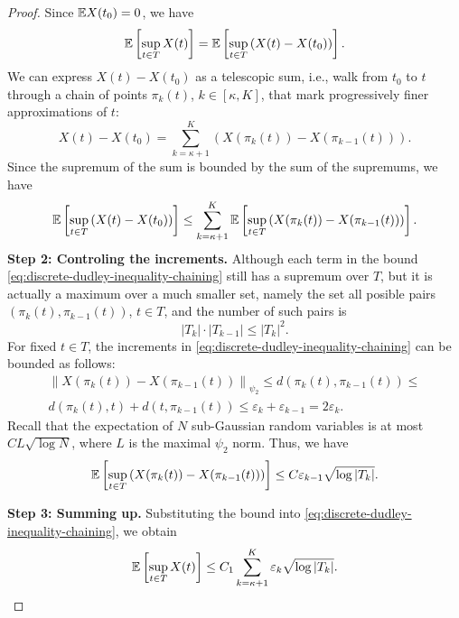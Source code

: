 \begin{proof}
    Since \({\mathbb E} X(t_{0})=0\), we have
    \begin{equation*}
        {\mathbb E}\left[\sup_{t\in T}X(t)\right]={\mathbb E}\left[\sup_{t\in T}\left(X(t)-X(t_{0})\right)\right].
    \end{equation*}
    We can express \(X(t)-X(t_{0})\) as a telescopic sum, i.e., walk from \(t_{0}\) to \(t\) through a chain of points \(\pi_{k}(t)\), \(k\in[\kappa,K]\), that mark progressively finer approximations of \(t\):
    \begin{equation*}
        X(t)-X(t_{0})=\sum_{k=\kappa+1}^{K}\left(X(\pi_{k}(t))-X(\pi_{k-1}(t))\right).
    \end{equation*}
    Since the supremum of the sum is bounded by the sum of the supremums, we have
    \begin{equation}
        \label{eq:discrete-dudley-inequality-chaining}
        {\mathbb E}\left[\sup_{t\in T}\left(X(t)-X(t_{0})\right)\right]\leq\sum_{k=\kappa+1}^{K}{\mathbb E}\left[\sup_{t\in T}\left(X(\pi_{k}(t))-X(\pi_{k-1}(t))\right)\right].
    \end{equation}
    \textbf{Step 2: Controling the increments.} Although each term in the bound \eqref{eq:discrete-dudley-inequality-chaining} still has a supremum over \(T\), but it is actually a maximum over a much smaller set, namely the set all posible pairs \((\pi_{k}(t),\pi_{k-1}(t))\), \(t\in T\), and the number of such pairs is
    \begin{equation*}
        |T_{k}|\cdot|T_{k-1}|\leq |T_{k}|^{2}.
    \end{equation*}
    For fixed \(t\in T\), the increments in \eqref{eq:discrete-dudley-inequality-chaining} can be bounded as follows:
    \begin{multline*}
        \left\|X(\pi_{k}(t))-X(\pi_{k-1}(t))\right\|_{\psi_{2}}\leq d(\pi_{k}(t),\pi_{k-1}(t))\leq \\
        d(\pi_{k}(t),t)+d(t,\pi_{k-1}(t))\leq \varepsilon_{k}+\varepsilon_{k-1}=2\varepsilon_{k}.
    \end{multline*}
    Recall that the expectation of \(N\) sub-Gaussian random variables is at most \(CL\sqrt{\log N}\), where \(L\) is the maximal \(\psi_{2}\) norm. Thus, we have
    \begin{equation*}
        {\mathbb E}\left[\sup_{t\in T}\left(X(\pi_{k}(t))-X(\pi_{k-1}(t))\right)\right]\leq C\varepsilon_{k-1}\sqrt{\log |T_{k}|}.
    \end{equation*}

    \textbf{Step 3: Summing up.} Substituting the bound into \eqref{eq:discrete-dudley-inequality-chaining}, we obtain
    \begin{equation*}
        {\mathbb E}\left[\sup_{t\in T}X(t)\right]\leq C_{1}\sum_{k=\kappa+1}^{K}\varepsilon_{k}\sqrt{\log |T_{k}|}.
    \end{equation*}


\end{proof}
